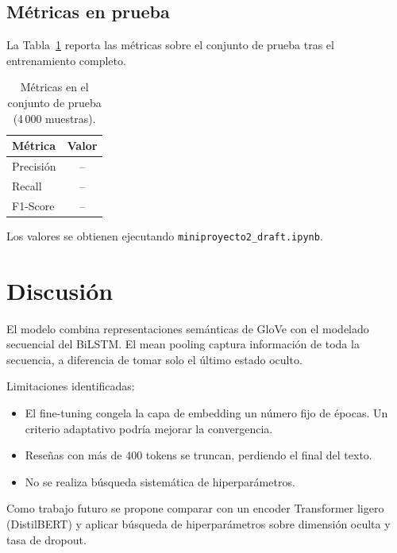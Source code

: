 \documentclass[letterpaper, 10 pt, conference]{ieeeconf}
\begin{document}
\subsection{M\'etricas en prueba}

La Tabla~\ref{tab:resultados} reporta las m\'etricas sobre el conjunto de
prueba tras el entrenamiento completo.

\begin{table}[h]
\centering
\caption{M\'etricas en el conjunto de prueba (4\,000 muestras).}
\label{tab:resultados}
\begin{tabular}{lc}
\toprule
\textbf{M\'etrica} & \textbf{Valor} \\
\midrule
Precisi\'on  & -- \\
Recall       & -- \\
F1-Score     & -- \\
\bottomrule
\end{tabular}
\end{table}

Los valores se obtienen ejecutando \texttt{miniproyecto2\_draft.ipynb}.

\section{Discusi\'on}

El modelo combina representaciones sem\'anticas de GloVe con el modelado
secuencial del BiLSTM. El mean pooling captura informaci\'on de toda la
secuencia, a diferencia de tomar solo el \'ultimo estado oculto.

Limitaciones identificadas:

\begin{itemize}
  \item El fine-tuning congela la capa de embedding un n\'umero fijo de
        \'epocas. Un criterio adaptativo podr\'ia mejorar la convergencia.
  \item Reseñas con m\'as de 400 tokens se truncan, perdiendo el final del
        texto.
  \item No se realiza b\'usqueda sistem\'atica de hiperpar\'ametros.
\end{itemize}

Como trabajo futuro se propone comparar con un encoder Transformer ligero
(DistilBERT) y aplicar b\'usqueda de hiperpar\'ametros sobre dimensi\'on
oculta y tasa de dropout.
\end{document}

